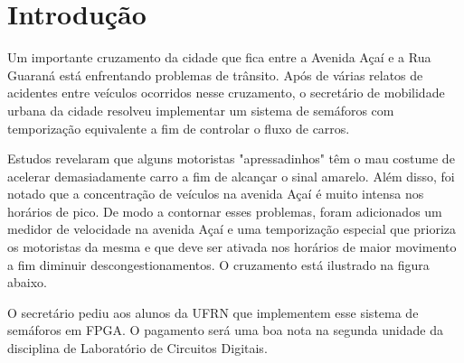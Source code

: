 \section{Introdução}
\setlength{\parindent}{2cm}




Um importante cruzamento da cidade que fica entre a Avenida Açaí e a Rua Guaraná está enfrentando problemas de trânsito. Após de várias relatos de acidentes entre veículos ocorridos nesse cruzamento, o secretário de mobilidade urbana da cidade resolveu implementar um sistema de semáforos com temporização equivalente a fim de controlar o fluxo de carros. 

Estudos revelaram que alguns motoristas "apressadinhos" têm o mau costume de acelerar demasiadamente carro a fim de alcançar o sinal amarelo. Além disso, foi notado que a concentração de veículos na avenida Açaí é muito intensa nos horários de pico. De modo a contornar esses problemas, foram adicionados um medidor de velocidade na avenida Açaí e uma temporização especial que prioriza os motoristas da mesma e que deve ser ativada nos horários de maior movimento a fim diminuir descongestionamentos. O cruzamento está ilustrado na figura abaixo.

O secretário pediu aos alunos da UFRN que implementem esse sistema de semáforos em FPGA. O pagamento será uma boa nota na segunda unidade da disciplina de Laboratório de Circuitos Digitais.